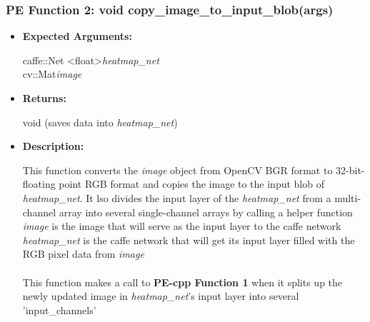 \documentclass{scrreprt}
\begin{document}
\subsubsection{PE Function 2: void copy\_image\_to\_input\_blob(args)}
\begin{itemize}
    \item \textbf{Expected Arguments:}

    caffe::Net \textless float\textgreater\quad\textit{heatmap\_net}
    \\
    cv::Mat\quad\textit{image}

    \item \textbf{Returns:}

    void (saves data into \textit{heatmap\_net})

    \item \textbf{Description:}

    This function converts the \textit{image} object from OpenCV BGR format to 32-bit-floating point RGB format and copies the image to the input blob of \textit{heatmap\_net}. It lso divides the input layer of the \textit{heatmap\_net} from a multi-channel array into several single-channel arrays by calling a helper function
    \\
    \textit{image} is the image that will serve as the input layer to the caffe network
    \\
    \textit{heatmap\_net} is the caffe network that will get its input layer filled with the RGB pixel data from \textit{image}
    \\\\
    This function makes a call to \textbf{PE-cpp Function 1} when it splits up the newly updated image in \textit{heatmap\_net}'s input layer into several 'input\_channels'
\end{itemize}
\end{document}
